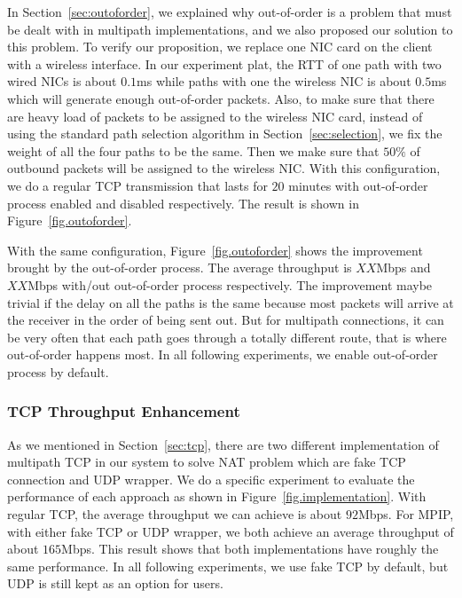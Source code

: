 In Section~\ref{sec:outoforder}, we explained why out-of-order is a problem that must be dealt with in multipath implementations, and we also proposed our solution to this problem. To verify our proposition, we replace one NIC card on the client with a wireless interface. In our experiment plat, the RTT of one path with two wired NICs is about $0.1$ms while paths with one the wireless NIC is about $0.5$ms which will generate enough out-of-order packets. Also, to make sure that there are heavy load of packets to be assigned to the wireless NIC card, instead of using the standard path selection algorithm in Section~\ref{sec:selection}, we fix the weight of all the four paths to be the same. Then we make sure that $50\%$ of outbound packets will be assigned to the wireless NIC.
With this configuration, we do a regular TCP transmission that lasts for $20$ minutes with out-of-order process enabled and disabled respectively. The result is shown in Figure~\ref{fig.outoforder}.

With the same configuration, Figure~\ref{fig.outoforder} shows the improvement brought by the out-of-order process. The average throughput is $XX$Mbps and $XX$Mbps with/out out-of-order process respectively. The improvement maybe trivial if the delay on all the paths is the same because most packets will arrive at the receiver in the order of being sent out. But for multipath connections, it can be very often that each path goes through a totally different route, that is where out-of-order happens most. In all following experiments, we enable out-of-order process by default.

\subsubsection{TCP Throughput Enhancement}
\label{sec:tcptp}

As we mentioned in Section~\ref{sec:tcp}, there are two different implementation of multipath TCP in our system to solve NAT problem which are fake TCP connection and UDP wrapper. We do a specific experiment to evaluate the performance of each approach as shown in Figure~\ref{fig.implementation}. With regular TCP, the average throughput we can achieve is about $92$Mbps. For MPIP, with either fake TCP or UDP wrapper, we both achieve an average throughput of about $165$Mbps. This result shows that both implementations have roughly the same performance. In all following experiments, we use fake TCP by default, but UDP is still kept as an option for users.

